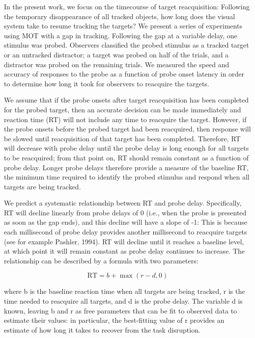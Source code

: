 \documentclass[doc]{apa}
\begin{document}
In the present work, we focus on the timecourse of target reacquisition:
Following the temporary disappearance of all tracked objects, how long does
the visual system take to resume tracking the targets?  We present a series
of experiments using MOT with a gap in tracking.  Following the gap at a
variable delay, one stimulus was probed.  Observers classified the probed
stimulus as a tracked target or an untracked distractor; a target was
probed on half of the trials, and a distractor was probed on the remaining
trials.  We measured the speed and accuracy of responses to the probe as a
function of probe onset latency in order to determine how long it took for
observers to reacquire the targets.

We assume that if the probe onsets after target reacquisition has been
completed for the probed target, then an accurate decision can be made
immediately and reaction time (RT) will not include any time to reacquire
the target.  However, if the probe onsets before the probed target had been
reacquired, then response will be slowed until reacquisition of that target
has been completed.  Therefore, RT will decrease with probe delay until the
probe delay is long enough for all targets to be reacquired; from that
point on, RT should remain constant as a function of probe delay.  Longer
probe delays therefore provide a measure of the baseline RT, the minimum
time required to identify the probed stimulus and respond when all targets
are being tracked.

We predict a systematic relationship between RT and probe delay.
Specifically, RT will decline linearly from probe delays of 0 (i.e., when
the probe is presented as soon as the gap ends), and this decline will have
a slope of -1: This is because each millisecond of probe delay provides
another millisecond to reacquire targets (see for example Pashler, 1994).
RT will decline until it reaches a baseline level, at which point it will
remain constant as probe delay continues to increase.  The relationship can
be described by a formula with two parameters:

\begin{equation}
  \label{eqn:model} \mathrm{RT} = b + \max\left(r - d, 0\right)
\end{equation}

where b is the baseline reaction time when all targets are being tracked, r
is the time needed to reacquire all targets, and d is the probe delay.  The
variable d is known, leaving b and r as free parameters that can be fit to
observed data to estimate their values: in particular, the best-fitting
value of r provides an estimate of how long it takes to recover from the
task disruption.
\end{document}
